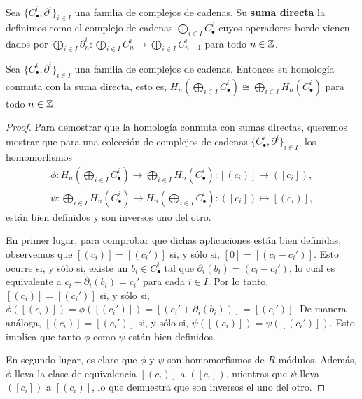 \begin{definicion}
	Sea $\{C_{\bullet}^{i}, \partial^{i}\}_{i \in I}$ una familia de complejos de cadenas.
	Su \textbf{suma directa} la definimos como el complejo de cadenas $\bigoplus_{i
		\in I}C^{i}_{\bullet}$ cuyos operadores borde vienen dados por $\bigoplus_{i
		\in I}{\partial}^{i}_{n}: \bigoplus_{i \in I}C^{i}_{n}\to \bigoplus_{i \in I}C^{i}
	_{n-1}$ para todo $n \in \mathbb{Z}$.
\end{definicion}
\begin{proposicion}
	\label{prop:hom-free-commute} Sea $\{C_{\bullet}^{i}, \partial^{i}\}_{i \in I}$
	una familia de complejos de cadenas. Entonces su homología conmuta con la suma
	directa, esto es,
	$H_{n}(\bigoplus_{i \in I}C_{\bullet}^{i}) \cong \bigoplus_{i \in I}H_{n}(C_{\bullet}
	^{i})$
	para todo $n \in \mathbb{Z}$.
\end{proposicion}
\begin{proof}
	Para demostrar que la homología conmuta con sumas directas, queremos mostrar
	que para una colección de complejos de cadenas
	$\{C_{\bullet}^{i}, \partial^{i}\}_{i \in I}$, los homomorfismos
	\begin{align*}
		\phi: H_{n}\left( \bigoplus_{i \in I}C_{\bullet}^{i}\right) \rightarrow \bigoplus_{i \in I}H_{n}(C_{\bullet}^{i}) : [(c_{i})] \mapsto ([c_{i}]), \\
		\psi: \bigoplus_{i \in I}H_{n}(C_{\bullet}^{i}) \rightarrow H_{n}\left( \bigoplus_{i \in I}C_{\bullet}^{i}\right) : ([c_{i}]) \mapsto [(c_{i})],
	\end{align*}
	están bien definidos y son inversos uno del otro.
	
	En primer lugar, para comprobar que dichas aplicaciones están bien definidas, observemos
	que $[(c_{i})] = [(c_{i}')]$ si, y sólo si, $[0] = [(c_{i}- c_{i}')]$. Esto
	ocurre si, y sólo si, existe un $b_{i}\in C_{\bullet}^{i}$ tal que
	$\partial_{i}(b_{i}) = (c_{i}- c_{i}')$, lo cual es equivalente a $c_{i}+ \partial
	_{i}(b_{i}) = c_{i}'$ para cada $i \in I$. Por lo tanto, $[(c_{i})] = [(c_{i}')
	]$ si, y sólo si, $\phi([(c_{i})]) = \phi([(c_{i}')]) = [(c_{i}' + \partial_{i}
	(b_{i}))] = [(c_{i}')]$. De manera análoga, $[(c_{i})] = [(c_{i}')]$ si, y
	sólo si, $\psi([(c_{i})]) = \psi([(c_{i}')])$. Esto implica que tanto $\phi$
	como $\psi$ están bien definidos.
	
	En segundo lugar, es claro que $\phi$ y $\psi$ son homomorfismos de $R$-módulos.
	Además, $\phi$ lleva la clase de equivalencia $[(c_{i})]$ a $([c_{i}])$,
	mientras que $\psi$ lleva $([c_{i}])$ a $[(c_{i})]$, lo que demuestra que son inversos
	el uno del otro.
\end{proof}

